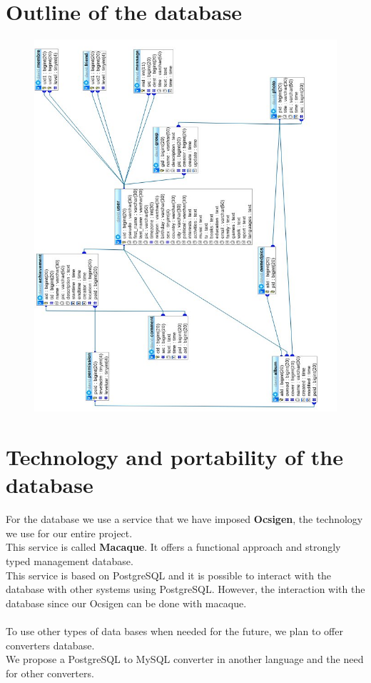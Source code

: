 \documentclass {life-en}
\begin{document}
\section{Outline of the database}

\begin{figure} [H]
  \begin{center}
    \includegraphics [width = 18cm]{img/imgdb.jpg}
  \end{center}
\end{figure}

\section{Technology and portability of the database}

For the database we use a service that we have imposed
\textbf{Ocsigen}, the technology we use for our entire project.\\
This service is called \textbf{Macaque}. It offers a functional approach
and strongly typed management database.\\
This service is based on PostgreSQL and it is possible to interact with the
database with other systems using PostgreSQL.
However, the interaction with the database since our Ocsigen
can be done with macaque.\\
\\
To use other types of data bases when needed
for the future, we plan to offer converters database.\\
We propose a PostgreSQL to MySQL converter in another language and
the need for other converters.
\end{document}
